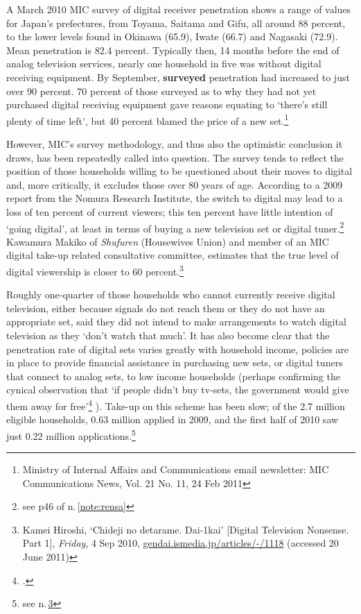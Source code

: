 \documentclass[11pt, oneside, a4paper, headsepline]{scrartcl}
\newcommand{\citej}[2] {\footcite[\nopp #1]{#2} }
\begin{document}
A March 2010 MIC survey of digital receiver penetration shows a range of values for Japan's prefectures, from Toyama, Saitama and Gifu, all around 88 percent, to the lower levels found in Okinawa (65.9), Iwate (66.7) and Nagasaki (72.9). Mean penetration is 82.4 percent. Typically then, 14 months before the end of analog television services, nearly one household in five was without digital receiving equipment. By September, \textbf{surveyed} penetration had increased to just over 90 percent. 70 percent of those surveyed as to why they had not yet purchased digital receiving equipment gave reasons equating to `there's still plenty of time left', but 40 percent blamed the price of a new set.\footnote{Ministry of Internal Affairs and Communications email newsletter: MIC Communications News, Vol. 21 No. 11, 24 Feb 2011}

However, MIC's survey methodology, and thus also the optimistic conclusion it draws, has been repeatedly called into question. The survey tends to reflect the position of those households willing to be questioned about their moves to digital and, more critically, it excludes those over 80 years of age. According to a 2009 report from the Nomura Research Institute, the switch to digital may lead to a loss of ten percent of current viewers; this ten percent have little intention of `going digital', at least in terms of buying a new television set or digital tuner.\footnote{see p46 of n.\,\ref{note:rensa}}  Kawamura Makiko of \textit{Shufuren} (Housewives Union) and member of an MIC digital take-up related consultative committee, estimates that the true level of digital viewership is closer to 60 percent.\footnote{Kamei Hiroshi, `Chideji no detarame. Dai-1kai' [Digital Television Nonsense. Part 1], \emph{Friday}, 4 Sep 2010, \url{gendai.ismedia.jp/articles/-/1118}\label{note:deta1}  (accessed 20 June 2011)}

Roughly one-quarter of those households who cannot currently receive digital television, either because signals do not reach them or they do not have an appropriate set, said they did not intend to make arrangements to watch digital television as they `don't watch that much'. It has also become clear that the penetration rate of digital sets varies greatly with household income, policies are in place to provide financial assistance in purchasing new sets, or digital tuners that connect to analog sets, to low income households (perhaps confirming the cynical observation that `if people didn't buy tv-sets, the government would give them away for free'\citej{25}{Barnhurst:2001}). Take-up on this scheme has been slow; of the 2.7 million eligible households, 0.63 million applied in 2009, and the first half of 2010 saw just 0.22 million applications.\footnote{see n.\,\ref{note:deta1}}
\end{document}
